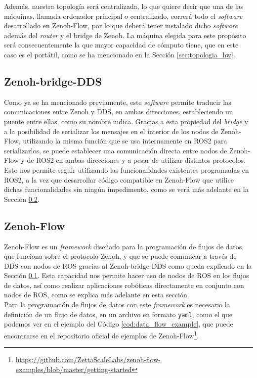 Además, nuestra topología será centralizada, lo que quiere decir que una de las
máquinas, llamada ordenador principal o centralizado, correrá todo el
\textit{software} desarrollado en Zenoh-Flow, por lo que deberá tener instalado
dicho \textit{software} además del \textit{router} y el bridge de Zenoh.
La máquina elegida para este propósito será consecuentemente la que mayor
capacidad de cómputo tiene, que en este caso es el portátil, como se ha
mencionado en la Sección \ref{sec:topologia_hw}.


\subsection{Zenoh-bridge-DDS}
\label{sec:zenoh_bridge}

Como ya se ha mencionado previamente, este \textit{software} permite traducir
las comunicaciones entre Zenoh y DDS, en ambas direcciones, estableciendo un
puente entre ellas, como su nombre indica.
Gracias a esta propiedad del \textit{bridge} y a la posibilidad de serializar
los mensajes en el interior de los nodos de Zenoh-Flow, utilizando la misma
función que se usa internamente en ROS2 para serializarlos, se puede establecer
una comunicación directa entre nodos de Zenoh-Flow y de ROS2 en ambas
direcciones y a pesar de utilizar distintos protocolos.
\\

Esto nos permite seguir utilizando las funcionalidades existentes programadas
en ROS2, a la vez que desarrollar código compatible en Zenoh-Flow que utilice
dichas funcionalidades sin ningún impedimento, como se verá más adelante en la
Sección \ref{sec:zenoh_flow}.
\\


\subsection{Zenoh-Flow}
\label{sec:zenoh_flow}

Zenoh-Flow es un \textit{framework} diseñado para la programación de flujos de
datos, que funciona sobre el protocolo Zenoh, y que se puede comunicar a través
de DDS con nodos de ROS gracias al Zenoh-bridge-DDS como queda explicado en la
Sección \ref{sec:zenoh_bridge}.
Esta capacidad nos permite hacer uso de nodos de ROS en los flujos de datos, así
como realizar aplicaciones robóticas directamente en conjunto con nodos de ROS,
como se explica más adelante en esta sección.
\\

Para la programación de flujos de datos con este \textit{framework} es necesario
la definición de un flujo de datos, en un archivo en formato \texttt{yaml}, como
el que podemos ver en el ejemplo del Código \ref{cod:data_flow_example}, que
puede encontrarse en el repositorio oficial de ejemplos de Zenoh-Flow\footnote{
\url{https://github.com/ZettaScaleLabs/zenoh-flow-examples/blob/master/getting-started}}.
\\

